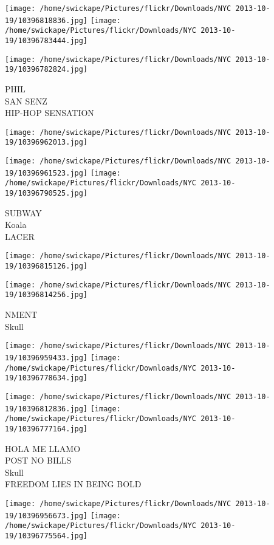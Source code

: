 \documentclass[10pt,letterpaper]{article}
\begin{document}
\texttt{[image: /home/swickape/Pictures/flickr/Downloads/NYC 2013-10-19/10396818836.jpg]}
\texttt{[image: /home/swickape/Pictures/flickr/Downloads/NYC 2013-10-19/10396783444.jpg]}

\texttt{[image: /home/swickape/Pictures/flickr/Downloads/NYC 2013-10-19/10396782824.jpg]}

PHIL\\
SAN SENZ\\
HIP{-}HOP SENSATION\\
\pagebreak

\texttt{[image: /home/swickape/Pictures/flickr/Downloads/NYC 2013-10-19/10396962013.jpg]}

\vspace{0.25in}
\texttt{[image: /home/swickape/Pictures/flickr/Downloads/NYC 2013-10-19/10396961523.jpg]}
\texttt{[image: /home/swickape/Pictures/flickr/Downloads/NYC 2013-10-19/10396790525.jpg]}

SUBWAY\\
Koala\\
LACER\\
\pagebreak

\texttt{[image: /home/swickape/Pictures/flickr/Downloads/NYC 2013-10-19/10396815126.jpg]}

\vspace{0.25in}
\texttt{[image: /home/swickape/Pictures/flickr/Downloads/NYC 2013-10-19/10396814256.jpg]}

NMENT\\
Skull\\
\pagebreak

\texttt{[image: /home/swickape/Pictures/flickr/Downloads/NYC 2013-10-19/10396959433.jpg]}
\texttt{[image: /home/swickape/Pictures/flickr/Downloads/NYC 2013-10-19/10396778634.jpg]}

\texttt{[image: /home/swickape/Pictures/flickr/Downloads/NYC 2013-10-19/10396812836.jpg]}
\texttt{[image: /home/swickape/Pictures/flickr/Downloads/NYC 2013-10-19/10396777164.jpg]}

HOLA ME LLAMO\\
POST NO BILLS\\
Skull\\
FREEDOM LIES IN BEING BOLD\\
\pagebreak

\texttt{[image: /home/swickape/Pictures/flickr/Downloads/NYC 2013-10-19/10396956673.jpg]}
\texttt{[image: /home/swickape/Pictures/flickr/Downloads/NYC 2013-10-19/10396775564.jpg]}
\end{document}
